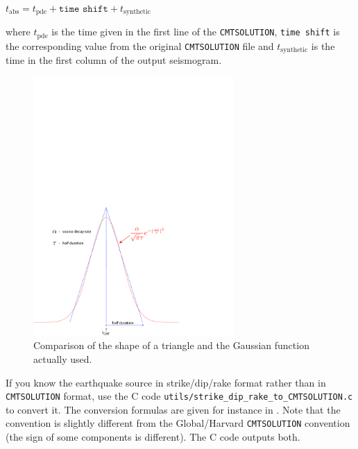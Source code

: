 \begin{itemize}
\begin{lyxcode}
$t_{\mathrm{abs}}=t_{\mathrm{pde}}+\texttt{time shift}+t_{\mathrm{synthetic}}$
\end{lyxcode}
where $t_{\mathrm{pde}}$ is the time given in the first line of the
\texttt{CMTSOLUTION}, \texttt{time shift} is the corresponding value
from the original \texttt{CMTSOLUTION} file and $t_{\mathrm{synthetic}}$
is the time in the first column of the output seismogram.

\end{itemize}
%
\begin{figure}
\noindent \begin{centering}
\includegraphics[width=3in]{figures/gauss_vs_triangle_mod.pdf}
\par\end{centering}
\caption{Comparison of the shape of a triangle and the Gaussian function actually used.}
\label{fig:gauss.vs.triangle}
\end{figure}

If you know the earthquake source in strike/dip/rake format rather than in \texttt{CMTSOLUTION} format,
use the C code \texttt{utils/strike\_dip\_rake\_to\_CMTSOLUTION.c} to convert it.
The conversion formulas are given for instance in \cite{AkRi80}.
Note that the \cite{AkRi80} convention is slightly different from the Global/Harvard \texttt{CMTSOLUTION} convention
(the sign of some components is different). The C code outputs both.\newline


